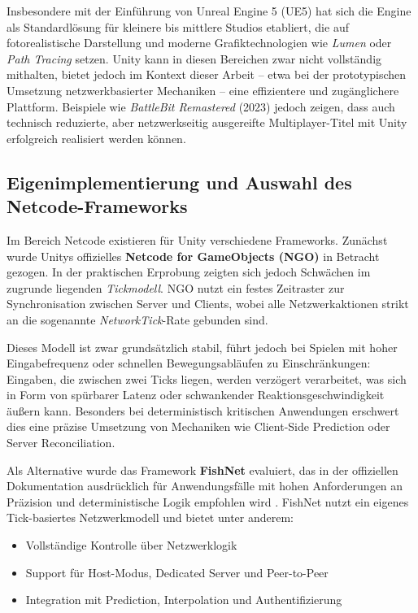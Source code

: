 \documentclass{article}
\begin{document}
Insbesondere mit der Einführung von Unreal Engine 5 (UE5) hat sich die Engine als Standardlösung für kleinere bis mittlere Studios etabliert, die auf fotorealistische Darstellung und moderne Grafiktechnologien wie \textit{Lumen} oder \textit{Path Tracing} setzen. Unity kann in diesen Bereichen zwar nicht vollständig mithalten, bietet jedoch im Kontext dieser Arbeit -- etwa bei der prototypischen Umsetzung netzwerkbasierter Mechaniken -- eine effizientere und zugänglichere Plattform. Beispiele wie \textit{BattleBit Remastered} (2023) jedoch zeigen, dass auch technisch reduzierte, aber netzwerkseitig ausgereifte Multiplayer-Titel mit Unity erfolgreich realisiert werden können.

\subsection{Eigenimplementierung und Auswahl des Netcode-Frameworks}


Im Bereich Netcode existieren für Unity verschiedene Frameworks. Zunächst wurde Unitys offizielles \textbf{Netcode for GameObjects (NGO)} in Betracht gezogen. In der praktischen Erprobung zeigten sich jedoch Schwächen im zugrunde liegenden \textit{Tickmodell}. NGO nutzt ein festes Zeitraster zur Synchronisation zwischen Server und Clients, wobei alle Netzwerkaktionen strikt an die sogenannte \textit{NetworkTick}-Rate gebunden sind.

Dieses Modell ist zwar grundsätzlich stabil, führt jedoch bei Spielen mit hoher Eingabefrequenz oder schnellen Bewegungsabläufen zu Einschränkungen: Eingaben, die zwischen zwei Ticks liegen, werden verzögert verarbeitet, was sich in Form von spürbarer Latenz oder schwankender Reaktionsgeschwindigkeit äußern kann. Besonders bei deterministisch kritischen Anwendungen erschwert dies eine präzise Umsetzung von Mechaniken wie Client-Side Prediction oder Server Reconciliation.

\newpage
Als Alternative wurde das Framework \textbf{FishNet} evaluiert, das in der offiziellen Dokumentation ausdrücklich für Anwendungsfälle mit hohen Anforderungen an Präzision und deterministische Logik empfohlen wird \cite{fishnetdocs}. FishNet nutzt ein eigenes Tick-basiertes Netzwerkmodell und bietet unter anderem:

\begin{itemize}
    \item Vollständige Kontrolle über Netzwerklogik
    \item Support für Host-Modus, Dedicated Server und Peer-to-Peer
    \item Integration mit Prediction, Interpolation und Authentifizierung
\end{itemize}
\end{document}
